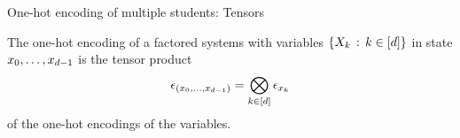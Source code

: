 \documentclass{beamer}
\begin{document}
%
%




    \begin{frame}{One-hot encoding of multiple students: Tensors}

        \begin{definition}
            The one-hot encoding of a factored systems with variables $\{X_{k} \, : \, k\in[d] \}$ in state $x_{0},\ldots,x_{d-1}$ is the tensor product
            \begin{align}
                \epsilon_{(x_{0},\ldots,x_{d-1})} = \bigotimes_{k\in[d]} \epsilon_{x_{k}}
            \end{align}
            of the one-hot encodings of the variables.
        \end{definition}


    \end{frame}
\end{document}
